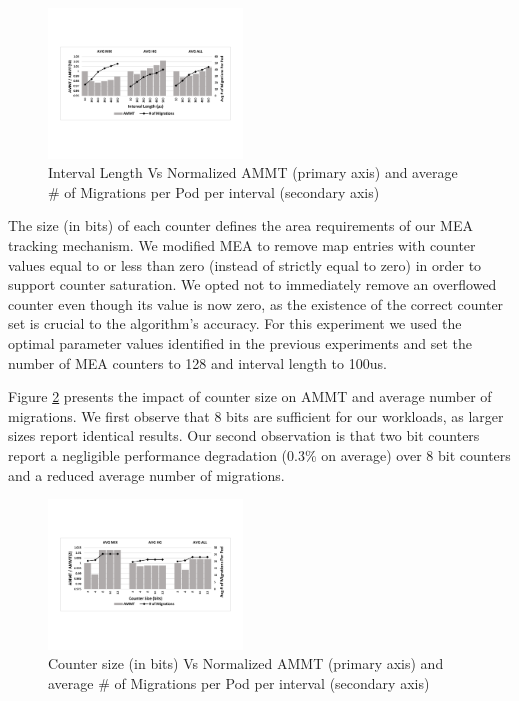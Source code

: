 \begin{figure}[h]
  \includegraphics[width=0.46\textwidth]{figures/interval_length_normalized.pdf}
  \caption{Interval Length Vs Normalized AMMT (primary axis) and average \# of Migrations per Pod per interval (secondary axis)}
  \label{fig:interval}
\end{figure}

The size (in bits) of each counter defines the area requirements of our MEA tracking mechanism.  
We modified MEA to remove map entries with counter values equal to or less than zero (instead of strictly equal to zero) in order to support counter saturation. We opted not to immediately remove an overflowed counter even though its value is now zero, as the existence of the correct counter set is crucial to the algorithm's accuracy. For this experiment we used the optimal parameter values identified in the previous experiments and set the number of MEA counters to 128 and interval length to 100us. 

Figure \ref{fig:counter_size} presents the impact of counter size on AMMT and average number of migrations. We first observe that 8 bits are sufficient for our workloads, as larger sizes report identical results. Our second observation is that two bit counters report a negligible performance degradation (0.3\% on average) over 8 bit counters and a reduced average number of migrations.

\begin{figure}[h]
  \includegraphics[width=0.46\textwidth]{figures/counter_size_normalized.pdf}
  \caption{Counter size (in bits) Vs Normalized AMMT (primary axis) and average \# of Migrations per Pod per interval (secondary axis)}
  \label{fig:counter_size}
\end{figure}

